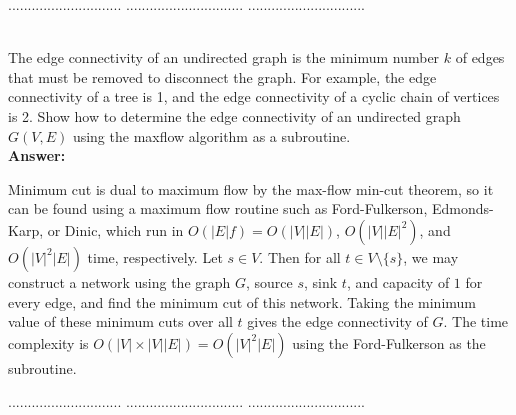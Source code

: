 \documentclass[a4paper,11pt]{article}
\begin{document}
\pagebreak

 $.............................$
 $..............................$
          $..............................$\\

\bigskip

\\
The edge connectivity of an undirected graph is the minimum number $k$ of edges
that must be removed to disconnect the graph. For example, the edge connectivity
of a tree is 1, and the edge connectivity of a cyclic chain of vertices is 2. Show
how to determine the edge connectivity of an undirected graph $G(V,E)$ 
using the maxflow algorithm as a subroutine. \\
{\bf Answer:} \par
Minimum cut is dual to maximum flow by the max-flow min-cut theorem, so it can be found using a maximum flow routine such as Ford-Fulkerson, Edmonds-Karp, or Dinic, which run in $O(|E|f) = O(|V| |E|)$, $O(|V| |E|^2)$, and $O(|V|^2 |E|)$ time, respectively. Let $s \in V$. Then for all $t \in V \setminus \{ s \}$, we may construct a network using the graph $G$, source $s$, sink $t$, and capacity of $1$ for every edge, and find the minimum cut of this network. Taking the minimum value of these minimum cuts over all $t$ gives the edge connectivity of $G$. The time complexity is $O(|V| \times |V| |E|) = O(|V|^2 |E|)$ using the Ford-Fulkerson as the subroutine.

\pagebreak

 $.............................$
 $..............................$
          $..............................$\\

\bigskip
\end{document}
